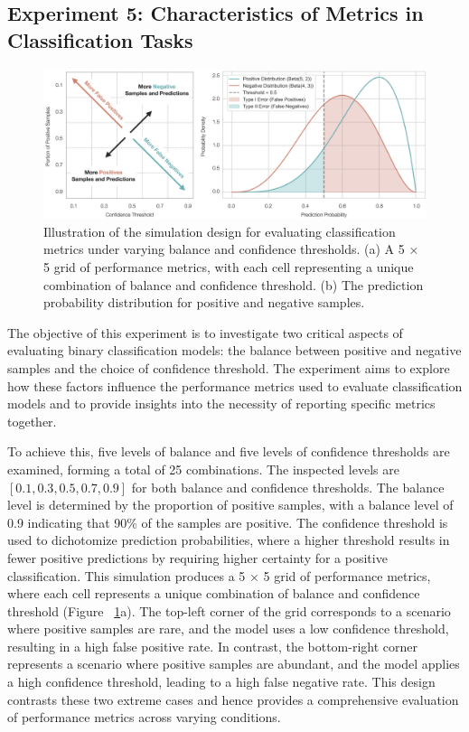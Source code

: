 \subsection{Experiment 5: Characteristics of Metrics in Classification Tasks}

\begin{figure}[H]
    \centering
    \includegraphics[width=1\textwidth]{fig_5.jpg}
    \caption{Illustration of the simulation design for evaluating classification metrics under varying balance and confidence thresholds. (a) A 5 × 5 grid of performance metrics, with each cell representing a unique combination of balance and confidence threshold. (b) The prediction probability distribution for positive and negative samples.}
    \label{fig:s5_classification}
\end{figure}

The objective of this experiment is to investigate two critical aspects of evaluating binary classification models: the balance between positive and negative samples and the choice of confidence threshold. The experiment aims to explore how these factors influence the performance metrics used to evaluate classification models and to provide insights into the necessity of reporting specific metrics together.



To achieve this, five levels of balance and five levels of confidence thresholds are examined, forming a total of 25 combinations. The inspected levels are $[0.1, 0.3, 0.5, 0.7, 0.9]$ for both balance and confidence thresholds. The balance level is determined by the proportion of positive samples, with a balance level of 0.9 indicating that 90\% of the samples are positive. The confidence threshold is used to dichotomize prediction probabilities, where a higher threshold results in fewer positive predictions by requiring higher certainty for a positive classification. This simulation produces a 5 × 5 grid of performance metrics, where each cell represents a unique combination of balance and confidence threshold (Figure ~\ref{fig:s5_classification}a). The top-left corner of the grid corresponds to a scenario where positive samples are rare, and the model uses a low confidence threshold, resulting in a high false positive rate. In contrast, the bottom-right corner represents a scenario where positive samples are abundant, and the model applies a high confidence threshold, leading to a high false negative rate. This design contrasts these two extreme cases and hence provides a comprehensive evaluation of performance metrics across varying conditions.

